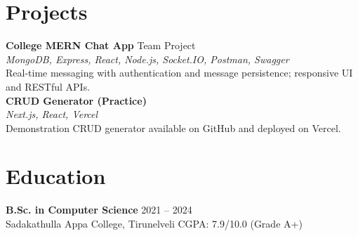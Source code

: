 \documentclass[11pt,a4paper]{article}
\begin{document}
\section*{Projects}
\textbf{College MERN Chat App} \hfill Team Project\\
\emph{MongoDB, Express, React, Node.js, Socket.IO, Postman, Swagger}\\
Real-time messaging with authentication and message persistence; responsive UI and RESTful APIs.\\

\textbf{CRUD Generator (Practice)}\\
\emph{Next.js, React, Vercel}\\
Demonstration CRUD generator available on GitHub and deployed on Vercel.

\section*{Education}
\textbf{B.Sc. in Computer Science} \hfill 2021 -- 2024\\
Sadakathulla Appa College, Tirunelveli \hfill CGPA: 7.9/10.0 (Grade A+)
\end{document}
